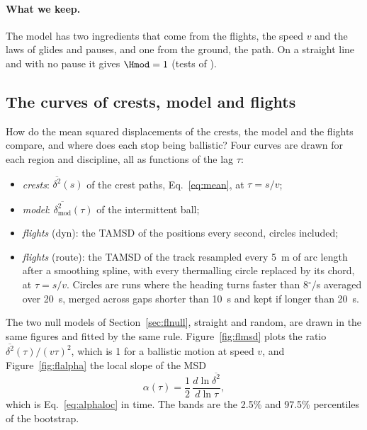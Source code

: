 \paragraph{What we keep.} The model has two ingredients that come from the flights, the speed $v$ and the laws of
glides and pauses, and one from the ground, the path. On a straight line and with no pause it gives $\Hmod = 1$
(tests of ).

\subsection{The curves of crests, model and flights}\label{sec:flcurves}

How do the mean squared displacements of the crests, the model and the flights compare, and where does each stop
being ballistic? Four curves are drawn for each region and discipline, all as functions of the lag $\tau$:
\begin{itemize}[nosep]
  \item \emph{crests}: $\overline{\delta^2}(s)$ of the crest paths, Eq.~\eqref{eq:mean}, at $\tau = s/v$;
  \item \emph{model}: $\overline{\delta^2_{\mathrm{mod}}}(\tau)$ of the intermittent ball;
  \item \emph{flights} (dyn): the TAMSD of the positions every second, circles included;
  \item \emph{flights} (route): the TAMSD of the track resampled every 5~m of arc length after a smoothing
        spline, with every thermalling circle replaced by its chord, at $\tau = s/v$. Circles are runs where the
        heading turns faster than 8$^\circ$/s averaged over 20~s, merged across gaps shorter than 10~s and kept
        if longer than 20~s.
\end{itemize}
The two null models of Section~\ref{sec:flnull}, straight and random, are drawn in the same figures and fitted by the
same rule. Figure~\ref{fig:flmsd} plots the ratio $\overline{\delta^2}(\tau)/(v\tau)^2$, which is 1 for a ballistic motion at
speed $v$, and Figure~\ref{fig:flalpha} the local slope of the MSD
\begin{equation}
  \alpha(\tau) = \frac12\,\frac{d\ln\overline{\delta^2}}{d\ln\tau},
  \label{eq:alpha}
\end{equation}
which is Eq.~\eqref{eq:alphaloc} in time. The bands are the 2.5\% and 97.5\% percentiles of the bootstrap.

